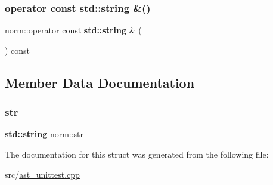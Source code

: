 \subsubsection{\texorpdfstring{operator const std\+::string \&()}{operator const std::string \&()}}
{\footnotesize\ttfamily norm\+::operator const \textbf{ std\+::string} \& (\begin{DoxyParamCaption}{ }\end{DoxyParamCaption}) const\hspace{0.3cm}{\ttfamily [inline]}}



\subsection{Member Data Documentation}
\mbox{\label{structnorm_a036899312aa207abbb8bb5f1aba8c780}} 
\subsubsection{\texorpdfstring{str}{str}}
{\footnotesize\ttfamily \textbf{ std\+::string} norm\+::str}



The documentation for this struct was generated from the following file\+:\begin{DoxyCompactItemize}
\item 
src/\hyperlink{ast__unittest_8cpp}{ast\+\_\+unittest.\+cpp}\end{DoxyCompactItemize}
